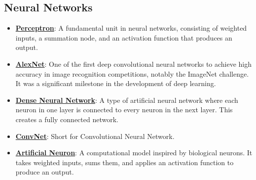 \documentclass{article}%
\begin{document}
%
\subsection{Neural Networks}%
\label{subsec:NeuralNetworks}%
\begin{itemize}[leftmargin=*]%
\item \href{https://purdue.brightspace.com/d2l/common/assets/pdfjs-d2l-dist/1.0.14-legacy/web/viewer.html?file=\%2Fcontent\%2Fenforced\%2F1095467-wl.202510.CS.24300.001\%2F02L2-Intro.pdf\%3Fou\%3D1095467\&lang=en-us\&container=d2l-fileviewer-rendered-pdf\&fullscreen=d2l-fileviewer-rendered-pdf-dialog\&height=667#page=45}{\textbf{Perceptron}}: A fundamental unit in neural networks, consisting of weighted inputs, a summation node, and an activation function that produces an output.%
\item \href{https://purdue.brightspace.com/d2l/common/assets/pdfjs-d2l-dist/1.0.14-legacy/web/viewer.html?file=\%2Fcontent\%2Fenforced\%2F1095467-wl.202510.CS.24300.001\%2F09L1-cnn.pdf\%3Fou\%3D1095467\&lang=en-us\&container=d2l-fileviewer-rendered-pdf\&fullscreen=d2l-fileviewer-rendered-pdf-dialog\&height=667#page=3}{\textbf{AlexNet}}: One of the first deep convolutional neural networks to achieve high accuracy in image recognition competitions, notably the ImageNet challenge. It was a significant milestone in the development of deep learning.%
\item \href{https://purdue.brightspace.com/d2l/common/assets/pdfjs-d2l-dist/1.0.14-legacy/web/viewer.html?file=\%2Fcontent\%2Fenforced\%2F1095467-wl.202510.CS.24300.001\%2F09L1-cnn.pdf\%3Fou\%3D1095467\&lang=en-us\&container=d2l-fileviewer-rendered-pdf\&fullscreen=d2l-fileviewer-rendered-pdf-dialog\&height=667#page=4}{\textbf{Dense Neural Network}}: A type of artificial neural network where each neuron in one layer is connected to every neuron in the next layer. This creates a fully connected network.%
\item \href{https://purdue.brightspace.com/d2l/common/assets/pdfjs-d2l-dist/1.0.14-legacy/web/viewer.html?file=\%2Fcontent\%2Fenforced\%2F1095467-wl.202510.CS.24300.001\%2F09L1-cnn.pdf\%3Fou\%3D1095467\&lang=en-us\&container=d2l-fileviewer-rendered-pdf\&fullscreen=d2l-fileviewer-rendered-pdf-dialog\&height=667#page=4}{\textbf{ConvNet}}: Short for Convolutional Neural Network.%
\item \href{https://purdue.brightspace.com/d2l/common/assets/pdfjs-d2l-dist/1.0.14-legacy/web/viewer.html?file=\%2Fcontent\%2Fenforced\%2F1095467-wl.202510.CS.24300.001\%2F09L1-cnn.pdf\%3Fou\%3D1095467\&lang=en-us\&container=d2l-fileviewer-rendered-pdf\&fullscreen=d2l-fileviewer-rendered-pdf-dialog\&height=667#page=5}{\textbf{Artificial Neuron}}: A computational model inspired by biological neurons. It takes weighted inputs, sums them, and applies an activation function to produce an output.%

\end{itemize}
\end{document}
